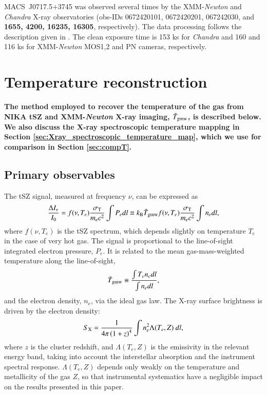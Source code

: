 \documentclass[twocolumn,traditabstract]{aa}
\begin{document}
\mbox{MACS~J0717.5+3745} was observed several times by the XMM-\textit{Newton} and \textit{Chandra} X-ray observatories (obs-IDs 0672420101, 0672420201, 067242030, and {\bf 1655, 4200, 16235, 16305}, respectively). The data processing follows the description given in \cite{Adam2016b}. The clean exposure time is 153 ks for \textit{Chandra} and 160 and 116 ks for XMM-\textit{Newton} MOS1,2 and PN cameras, respectively.

\section{Temperature reconstruction}\label{sec:method}
{\bf The method employed to recover the temperature of the gas from NIKA tSZ and XMM-\textit{Newton} X-ray imaging, $\bar{T}_{\rm gmw}$, is described below. We also discuss the X-ray spectroscopic temperature mapping in Section \ref{sec:Xray_spectroscopic_temperature_map}, which we use for comparison in Section \ref{sec:compT}.}

\subsection{Primary observables}
The tSZ signal, measured at frequency $\nu$, can be expressed as
\begin{equation}
	\frac{\Delta I_{\nu}}{I_0} =  f(\nu, T_e) \frac{\sigma_{\rm T}}{m_e c^2} \int P_e dl \equiv k_{\rm B} \bar{T}_{\rm gmw} f(\nu, T_e) \frac{\sigma_{\rm T}}{m_e c^2} \int n_e dl,
\label{eq:dIsz}
\end{equation}
where $f(\nu, T_e)$ is the tSZ spectrum, which depends slightly on temperature $T_e$ in the case of very hot gas. The signal is proportional to the line-of-sight integrated electron pressure, $P_{e}$. It is related to the mean gas-mass-weighted temperature along the line-of-sight, 
\begin{equation}
        \bar{T}_{\rm gmw} \equiv \frac{\int T_e n_e dl}{\int n_e dl},
        \label{eq:Tgmw_def}
\end{equation}
and the electron density, $n_e$, via the ideal gas law. The X-ray surface brightness is driven by the electron density:
\begin{equation}
        S_{\rm X}= \frac{1}{4 \pi \left(1+z\right)^4} \int n_e^2 \Lambda(T_e, Z) \ dl,
        \label{eq:sx}
\end{equation}
where  $z$ is the cluster redshift, and $\Lambda(T_e, Z)$ is the emissivity in the relevant energy band, taking into account the interstellar absorption and the instrument spectral response. $\Lambda(T_e, Z)$ depends only weakly on the temperature and metallicity of the gas $Z$, so that instrumental systematics have a negligible impact on the results presented in this paper.
\end{document}
